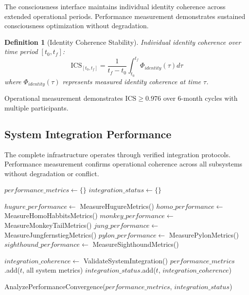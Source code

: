 \documentclass[12pt,a4paper]{article}
\newtheorem{definition}[theorem]{Definition}
\begin{document}
The consciousness interface maintains individual identity coherence across extended operational periods. Performance measurement demonstrates sustained consciousness optimization without degradation.

\begin{definition}[Identity Coherence Stability]
Individual identity coherence over time period $[t_0, t_f]$:
$$\text{ICS}_{[t_0,t_f]} = \frac{1}{t_f - t_0} \int_{t_0}^{t_f} \Phi_{identity}(\tau) d\tau$$
where $\Phi_{identity}(\tau)$ represents measured identity coherence at time $\tau$.
\end{definition}

Operational measurement demonstrates $\text{ICS} \geq 0.976$ over 6-month cycles with multiple participants.

\subsection{System Integration Performance}

The complete infrastructure operates through verified integration protocols. Performance measurement confirms operational coherence across all subsystems without degradation or conflict.

\begin{algorithm}
\caption{Integrated System Performance Monitoring}
\begin{algorithmic}[1]
    \State $performance\_metrics \gets \{\}$
    \State $integration\_status \gets \{\}$
    
        \State $hugure\_performance \gets$ MeasureHugureMetrics()
        \State $homo\_performance \gets$ MeasureHomoHabbitsMetrics()
        \State $monkey\_performance \gets$ MeasureMonkeyTailMetrics()
        \State $jung\_performance \gets$ MeasureJungfernstiegMetrics()
        \State $pylon\_performance \gets$ MeasurePylonMetrics()
        \State $sighthound\_performance \gets$ MeasureSighthoundMetrics()
        
        \State $integration\_coherence \gets$ ValidateSystemIntegration()
        \State $performance\_metrics$.add($t$, all system metrics)
        \State $integration\_status$.add($t$, $integration\_coherence$)
    \EndFor
    
    \State \Return AnalyzePerformanceConvergence($performance\_metrics$, $integration\_status$)
\EndProcedure
\end{algorithmic}
\end{algorithm}
\end{document}
